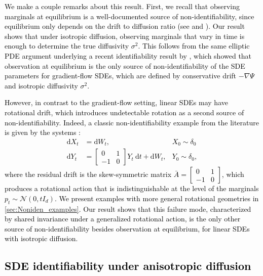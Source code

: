 \documentclass[twoside,11pt]{article}
\newcommand{\rv}[1]{\textcolor{black}{#1}}
\begin{document}
\rv{We make a couple remarks about this result. First, we recall that observing marginals at equilibrium is a well-documented source of non-identifiability, since equilibrium only depends on the drift to diffusion ratio (see \citet{lavenant2021towards} and \citet[Proposition 4.1]{guan2025gradient}). Our result shows that under isotropic diffusion, observing marginals that vary in time is enough to determine the true diffusivity $\sigma^2$. This follows from the same elliptic PDE argument underlying a recent identifiability result by \citet{guan2025gradient}, which showed that observation at equilibrium is the only source of non-identifiability of the SDE parameters for gradient-flow SDEs, which are defined by conservative drift $-\nabla \Psi$ and isotropic diffusivity $\sigma^2$.}

\rv{However, in contrast to the gradient-flow setting, linear SDEs may have rotational drift, which introduces undetectable rotation as a second source of non-identifiability. Indeed, a classic non-identifiability example from the literature is given by the systems \citep{hashimoto2016learning, shen2024learning}:
\begin{align}
    \mathrm{d}X_t &= \mathrm{d}W_t, &X_0 \sim \delta_0\\
    \mathrm{d}Y_t &= \begin{bmatrix} 0 & 1 \\ -1 & 0  \end{bmatrix}Y_t \: \mathrm{d}t
    + \mathrm{d}W_t, &  Y_0 \sim \delta_0,
\end{align}
where the residual drift is the skew-symmetric matrix $\bar{A}=\begin{bmatrix}
    0 & 1 \\
    -1 & 0
\end{bmatrix}$,
which produces a rotational action that is indistinguishable at the level of the marginals $p_t \sim \mathcal{N}(0, t I_d)$. We present examples with more general rotational geometries in \cref{sec:Noniden_examples}. Our result shows that 
this failure mode, characterized by shared invariance under a generalized rotational action, is the only other source of non-identifiability besides observation at equilibrium, for linear SDEs with isotropic diffusion.}

\rv{\subsection{SDE identifiability under anisotropic diffusion}}
\label{sec: SDE_param_identifiability_anisotropic}
\end{document}
